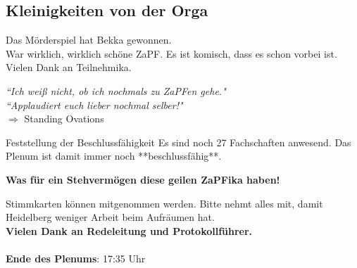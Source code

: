 \tocless\subsection{Kleinigkeiten von der Orga}
    Das Mörderspiel hat Bekka gewonnen. \\

    War wirklich, wirklich schöne ZaPF. Es ist komisch, dass es schon vorbei ist.
    Vielen Dank an Teilnehmika. \\

    \begin{center}
      \textit{``Ich weiß nicht, ob ich nochmals zu ZaPFen gehe."} \\
      \textit{``Applaudiert euch lieber nochmal selber!"} \\
      $\Rightarrow$ Standing Ovations
    \end{center}

    \begin{success}{Feststellung der Beschlussfähigkeit}
      Es sind noch 27 Fachschaften anwesend.
      Das Plenum ist damit immer noch **beschlussfähig**.
      \begin{center}
        \textbf{Was für ein Stehvermögen diese geilen ZaPFika haben!}
      \end{center}
    \end{success}

    Stimmkarten können mitgenommen werden. Bitte nehmt alles mit, damit Heidelberg weniger Arbeit beim Aufräumen hat. \\

    \textbf{Vielen Dank an Redeleitung und Protokollführer.} \\ \\

    \textbf{Ende des Plenums}: 17:35 Uhr
